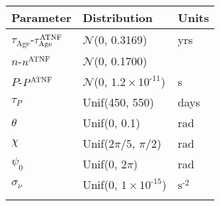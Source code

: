 \begin{tabular}{lll} \hhline{===}
        Parameter & Distribution &  Units\\ \hline
$\tau_{\mathrm{Age}}$\textrm{-}$\tau_{\mathrm{Age}}^{\tiny\textrm{ATNF}}$
 & $\mathcal{N}$(0, 0.3169) & yrs\\
$n$\textrm{-}$n^{\tiny\textrm{ATNF}}$ & $\mathcal{N}$(0, 0.1700) & \\
$P$\textrm{-}$P^{\tiny\textrm{ATNF}}$
 & $\mathcal{N}$(0, ${1.2}\times 10^{\textrm{-}11}$) & s\\
$\tau_{P}$ & Unif(450, 550) & days\\
$\theta$ & Unif(0, 0.1) & rad\\
$\chi$ & Unif($2\pi/5$, $\pi/2$) & rad\\
$\psi_0$ & Unif(0, $2\pi$) & rad\\
$\sigma_{\dot{\nu}}$ & Unif(0, ${1}\times 10^{\textrm{-}15}$) & $\mathrm{s}^{\textrm{-}2}$\\
\hhline{===}
\end{tabular}